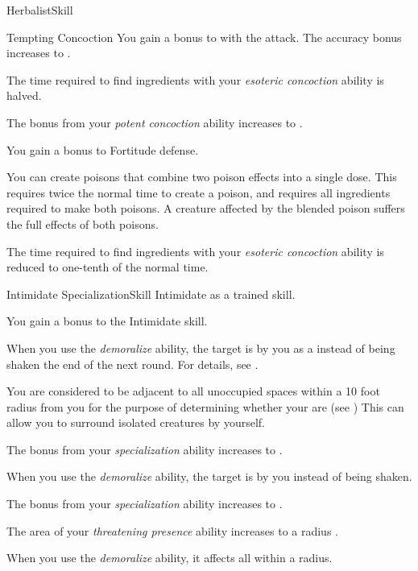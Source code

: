 \begin{feat}{Herbalist}{Skill}
\begin{attuneability}{Tempting Concoction}
            \rankline
             You gain a  bonus to  with the attack.
             The accuracy bonus increases to .
        \end{attuneability}

         The time required to find ingredients with your \textit{esoteric concoction} ability is halved.

         The bonus from your \textit{potent concoction} ability increases to .

         You gain a  bonus to Fortitude defense.

         You can create poisons that combine two poison effects into a single dose.
        This requires twice the normal time to create a poison, and requires all ingredients required to make both poisons.
        A creature affected by the blended poison suffers the full effects of both poisons.

         The time required to find ingredients with your \textit{esoteric concoction} ability is reduced to one-tenth of the normal time.
    \end{feat}

    \begin{feat}{Intimidate Specialization}{Skill}
        \featpre Intimidate as a trained skill.

         You gain a  bonus to the Intimidate skill.

         When you use the \textit{demoralize} ability, the target is \shaken by you as a  instead of being shaken the end of the next round.
        For details, see .

         You are considered to be adjacent to all unoccupied spaces within a 10 foot radius  from you for the purpose of determining whether your  are \surrounded (see )
        This can allow you to surround isolated creatures by yourself.

         The bonus from your \textit{specialization} ability increases to .

         When you use the \textit{demoralize} ability, the target is \frightened by you instead of being shaken.

         The bonus from your \textit{specialization} ability increases to .

         The area of your \textit{threatening presence} ability increases to a \areasmall radius .

         When you use the \textit{demoralize} ability, it affects all  within a \largearea radius.
    \end{feat}


